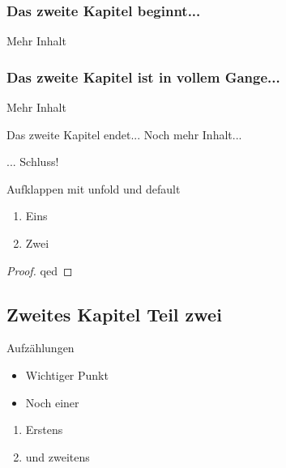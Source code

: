 \documentclass[aspectratio=169]{beamer}
\begin{document}
\begin{frame}
\frametitle{Das zweite Kapitel beginnt...}
Mehr Inhalt%
%
\end{frame}

\begin{frame}
\frametitle{Das zweite Kapitel ist in vollem Gange...}
Mehr Inhalt%
%
\end{frame}

\begin{frame}{Das zweite Kapitel endet...}
Noch mehr Inhalt...
\pause

... Schluss!
\end{frame}

\begin{frame}[<+->]{Aufklappen mit unfold und default}
\begin{enumerate}
\item Eins
\item Zwei
\end{enumerate}
\begin{proof}
	qed
\end{proof}
\end{frame}

\subsection{Zweites Kapitel Teil zwei}

\begin{frame}{Aufzählungen}
\begin{itemize}
\item Wichtiger Punkt
\item Noch einer
\end{itemize}
\begin{enumerate}
\item Erstens
\item und zweitens
\end{enumerate}
\end{frame}
\end{document}
